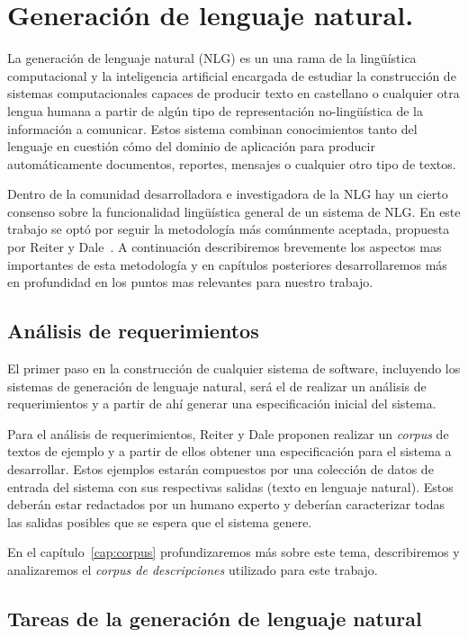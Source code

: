 \chapter{Generación de lenguaje natural.}
\label{cap:nlg_intro}
La generación de lenguaje natural (NLG) es un una rama de la lingüística computacional y la inteligencia artificial encargada de estudiar la construcción de sistemas computacionales capaces de producir texto en castellano o cualquier otra lengua humana a partir de algún tipo de representación no-lingüística de la información a comunicar. Estos sistema combinan conocimientos tanto del lenguaje en cuestión cómo del dominio de aplicación para producir automáticamente documentos, reportes, mensajes o cualquier otro tipo de textos.

Dentro de la comunidad desarrolladora e investigadora de la NLG hay un cierto consenso sobre la funcionalidad lingüística general de un sistema de NLG.
En este trabajo se optó por seguir la metodología más comúnmente aceptada, propuesta por Reiter y Dale~\cite{reiter_dale}.
A continuación describiremos brevemente los aspectos mas importantes de esta metodología y en capítulos posteriores desarrollaremos más en profundidad en los puntos mas relevantes para nuestro trabajo.

\section{Análisis de requerimientos}
El primer paso en la construcción de cualquier sistema de software, incluyendo los sistemas de generación de lenguaje natural, será el de realizar un análisis de requerimientos y a partir de ahí generar una especificación inicial del sistema. 

Para el análisis de requerimientos, Reiter y Dale proponen realizar un \emph{corpus} de textos de ejemplo y a partir de ellos obtener una especificación para el sistema a desarrollar. Estos ejemplos estarán compuestos por una colección de datos de entrada del sistema con sus respectivas salidas (texto en lenguaje natural). Estos deberán estar redactados por un humano experto y deberían caracterizar todas las salidas posibles que se espera que el sistema genere.

En el capítulo~\ref{cap:corpus} profundizaremos más sobre este tema, describiremos y analizaremos el \emph{corpus de descripciones} utilizado para este trabajo.

\section{Tareas de la generación de lenguaje natural}


